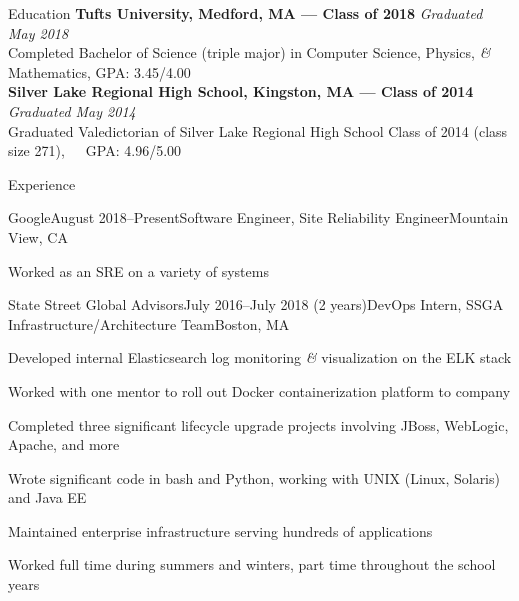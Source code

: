 \documentclass{resume}
\begin{document}
  \begin{rSection}{Education}
    {\bf Tufts University, Medford, MA --- Class of 2018} \hfill {\em Graduated May 2018} \\ 
    { Completed Bachelor of Science (triple major) in Computer Science, Physics, \textit{\&} Mathematics, GPA: 3.45/4.00 }\\
    {\bf Silver Lake Regional High School, Kingston, MA --- Class of 2014} \hfill {\em Graduated May 2014}\\ 
    { Graduated Valedictorian of Silver Lake Regional High School Class of 2014 (class size 271),\ \ \  GPA: 4.96/5.00 }
  \end{rSection}

  \begin{rSection}{Experience}
    \begin{rSubsection}{Google}{August 2018--Present}{Software Engineer, Site Reliability Engineer}{Mountain View, CA}
    \item Worked as an SRE on a variety of systems
    \end{rSubsection}
    \begin{rSubsection}{State Street Global Advisors}{July 2016--July 2018 (2 years)}{DevOps Intern, SSGA Infrastructure/Architecture Team}{Boston, MA}
    \item Developed internal Elasticsearch log monitoring \textit{\&} visualization on the ELK stack
    \item Worked with one mentor to roll out Docker containerization platform to company
    \item Completed three significant lifecycle upgrade projects involving JBoss, WebLogic, Apache, and more
    \item Wrote significant code in bash and Python, working with UNIX (Linux, Solaris) and Java EE
    \item Maintained enterprise infrastructure serving hundreds of applications
    \item Worked full time during summers and winters, part time throughout the school years
    \end{rSubsection}
  \end{rSection}
\end{document}
